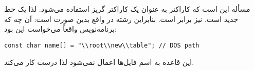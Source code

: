 \section{}
\paragraph{}\label{answer:37}
مسأله این است که کاراکتر \lr{\texttt{\textbackslash}} به عنوان یک کاراکتر گریز استفاده می‌شود. لذا  یک خط جدید است.  نیز برابر  است. بنابراین رشته  در واقع بدین صورت است:
\LTR\noindent
{}
\RTL
آن چه که برنامه‌نویس واقعاً می‌خواست این بود:
ٰ\begin{LTR}
     \begin{lstlisting}[style=C++Style]
         const char name[] = "\\root\\new\\table"; // DOS path
     \end{lstlisting}
\end{LTR}

این قاعده به  اسم فایل‌ها اعمال نمی‌شود لذا  درست کار می‌کند.